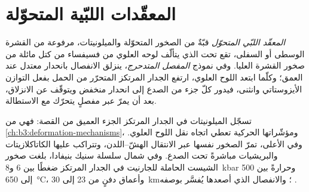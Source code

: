 \section{المعقّدات اللبّية المتحوّلة}\label{sec:b3:extension-strike-slip:core}

\begin{definition}\label{def:b3:extension-strike-slip:core-complex}
\emph{المعقّد اللبّي المتحوّل} قبّةٌ من الصخور المتحوّلة والميلونيتات،
مرفوعة من القشرة الوسطى أو السفلى،
تقع تحت  الذي يتألّف لوحه العلوي من فسيفساء من كتل مائلة من
صخور القشرة العليا. وفي نموذج \emph{المفصل المتدحرج}،
ينزلق الانفصال بانحدار معتدل عند العمق؛ وكلّما ابتعد اللوح العلوي،
ارتفع الجدار المرتكز المتحرّر من الحمل بفعل التوازن الأيزوستاتي وانثنى، فيدور كلّ جزء
من الصدع إلى انحدار منخفض ويتوقّف عن الانزلاق، بعد أن يمرّ عبر
مفصلٍ يتحرّك مع الاستطالة.
\end{definition}

تسجّل الميلونيتات في الجدار المرتكز الجزء العميق من القصة: فهي
 من \cref{ch:b3:deformation-mechanisms}، ومؤشّراتها الحركية
تعطي اتجاه نقل اللوح العلوي. وفي الأعلى، تمرّ الصخور نفسها
عبر الانتقال الهشّ--اللدن، وتتراكب عليها الكاتاكلازيتات والبريشيات
مباشرةً تحت الصدع. وفي شمال سلسلة سنيك بنيفادا،
بلغت صخور الشيست الحاملة للجارنيت في الجدار المرتكز ضغطًا بين 6 و\qty{8}{kbar}
وحرارةً بين 500 إلى \qty{650}{\celsius}، وأعماق دفنٍ من 23 إلى \qty{30}{km}؛ والانفصال الذي
أصعدها يُفسَّر بوصفه .

